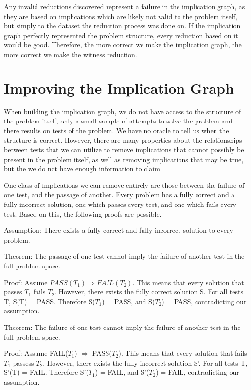 \documentclass[11pt]{article}
\begin{document}
Any invalid reductions discovered represent a failure in the implication graph, as they are based on implications which are likely not valid to the problem itself, but simply to the dataset the reduction process was done on. If the implication graph perfectly represented the problem structure, every reduction based on it would be good. Therefore, the more correct we make the implication graph, the more correct we make the witness reduction.



\section{Improving the Implication Graph}



When building the implication graph, we do not have access to the structure of the problem itself, only a small sample of attempts to solve the problem and there results on tests of the problem. We have no oracle to tell us when the structure is correct. However, there are many properties about the relationships between tests that we can utilize to remove implications that cannot possibly be present in the problem itself, as well as removing implications that may be true, but the we do not have enough information  to claim.

One class of implications we can remove entirely are those between the failure of one test, and the passage of another. Every problem has a fully correct and a fully incorrect solution, one which passes every test, and one which fails every test. Based on this, the following proofs are possible.


Assumption: There exists a fully correct and fully incorrect solution to every problem.

Theorem: The passage of one test cannot imply the failure of another test in the full problem space.

Proof: Assume $PASS(T_1) \Rightarrow FAIL(T_2)$. This means that every solution that passes $T_1$ fails $T_2$. However, there exists the fully correct solution S. For all tests T, S(T) = PASS. Therefore S($T_1$) = PASS, and S($T_2$) = PASS, contradicting our assumption.

Theorem: The failure of one test cannot imply the failure of another test in the full problem space.

Proof: Assume FAIL($T_1$) $\Rightarrow$ PASS($T_2$). This means that every solution that fails $T_1$ passess $T_2$. However, there exists the fully incorrect solution S'. For all tests T, S'(T) = FAIL. Therefore S'($T_1$) = FAIL, and S'($T_2$) = FAIL, contradicting our assumption.
\end{document}
